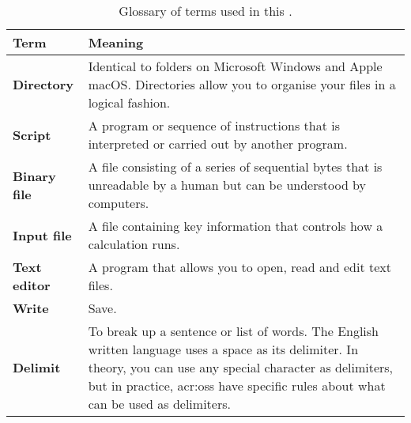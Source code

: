     \begin{table}[h]
      \centering
      \caption{Glossary of terms used in this .}
      \renewcommand{\arraystretch}{1.25}
      \begin{tabularx}{\textwidth}{lX}
        \toprule
        \textbf{Term}        & \textbf{Meaning}                                                                                                                                                                                                                                            \\ \midrule
        \textbf{Directory}   & Identical to folders on Microsoft Windows and Apple macOS. Directories allow you to organise your files in a logical fashion.                                                                                                                               \\
        \textbf{Script}      & A program or sequence of instructions that is interpreted or carried out by another program.                                                                                                                                                                \\
        \textbf{Binary file} & A file consisting of a series of sequential bytes that is unreadable by a human but can be understood by computers.                                                                                                                                         \\
        \textbf{Input file}  & A file containing key information that controls how a calculation runs.                                                                                                                                                                                     \\
        \textbf{Text editor} & A program that allows you to open, read and edit text files.                                                                                                                                                                                                \\
        \textbf{Write}       & Save.                                                                                                                                                                                                                                                       \\
        \textbf{Delimit}     & To break up a sentence or list of words. The English written language uses a space as its delimiter. In theory, you can use any special character as delimiters, but in practice, \glspl*{acr:os} have specific rules about what can be used as delimiters. \\ \bottomrule
      \end{tabularx}
      \label{tab:filesGloss}
    \end{table}


